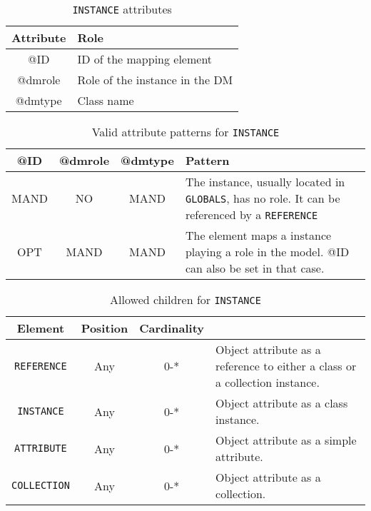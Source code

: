 \begin{table}[!htbp]
\small
\centering
\begin{tabulary}{\linewidth}{|c|J|}       
       \hline 
            \textbf{Attribute} & 
            \textbf {Role}\\
       \hline         \hline  
            @ID & 
            ID of the mapping element  \\
        \hline 
            @dmrole & 
            Role of the instance in the DM \\
        \hline 
            @dmtype & 
            Class name \\
        \hline 
     \end{tabulary}
     \caption{\texttt{INSTANCE} attributes} 
     \label{tbl:instance-att}
 \end{table}

\begin{table}[!htbp]
\small
\centering
\begin{tabulary}{\linewidth}{|c|c|c|J|}
    \hline 
        \textbf{@ID} &
        \textbf{@dmrole} &
        \textbf{@dmtype} &
        \textbf{Pattern}\\
    \hline      \hline  
        MAND &           
        NO &           
        MAND &           
        The instance, usually located in \texttt{GLOBALS}, has no role. It can be referenced by a \texttt{REFERENCE}  \\
    \hline   
        OPT &           
        MAND &           
        MAND &           
        The element maps a instance playing a role in the model. @ID can also be set in that case. \\
   \hline 
\end{tabulary}
     \caption{Valid attribute patterns for  \texttt{INSTANCE}} 
     \label{tbl:instance-pattern}
 \end{table}


\begin{table}[!htbp]
\small
\centering
\begin{tabulary}{\linewidth}{|c |c |c|J|}
    \hline 
        \textbf{Element} &
        \textbf{Position} &
        \textbf{Cardinality} &
        \\
    \hline      \hline  
        \texttt{REFERENCE}  &        
        Any &           
        0-* &
         Object attribute as a reference to either a class or a collection instance.\\
    \hline    
        \texttt{INSTANCE} &           
        Any &           
        0-* &
         Object attribute as a class instance. \\
    \hline    
        \texttt{ATTRIBUTE} &           
        Any &           
        0-* &
       Object attribute as a simple attribute. \\
    \hline    
        \texttt{COLLECTION} &           
        Any &           
        0-* &
         Object attribute  as a collection.\\
    \hline 
\end{tabulary}
     \caption{Allowed children for \texttt{INSTANCE}} 
     \label{tbl:instance-chilren}
 \end{table}